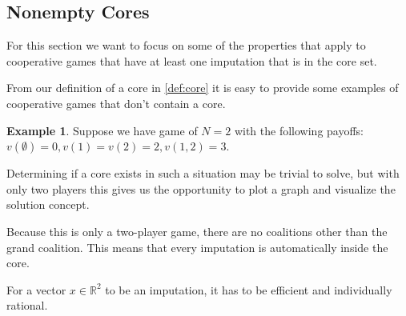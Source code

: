 \documentclass[10pt,a4paper,titlepage]{article}
\theoremstyle{plain}
\theoremstyle{definition}
\newtheorem{example}[thm]{Example} %
\begin{document}
 \subsection{Nonempty Cores}
 For this section we want to focus on some of the properties that apply to cooperative games that have at least one imputation that is in the core set.

 From our definition of a core in \ref{def:core} it is easy to provide some examples of cooperative games that don't contain a core.

 \begin{example}
    Suppose we have game of $N = 2$ with the following payoffs: $v(\emptyset) = 0, v(1) = v(2) = 2, v(1, 2) = 3$.

    Determining if a core exists in such a situation may be trivial to solve, but with only two players this gives us the opportunity to plot a graph and visualize the solution concept.
    
    Because this is only a two-player game, there are no coalitions other than the grand coalition. This means that every imputation is automatically inside the core.

    For a vector $x \in \mathbb{R}^2$ to be an imputation, it has to be efficient and individually rational.

 \end{example}
\end{document}

